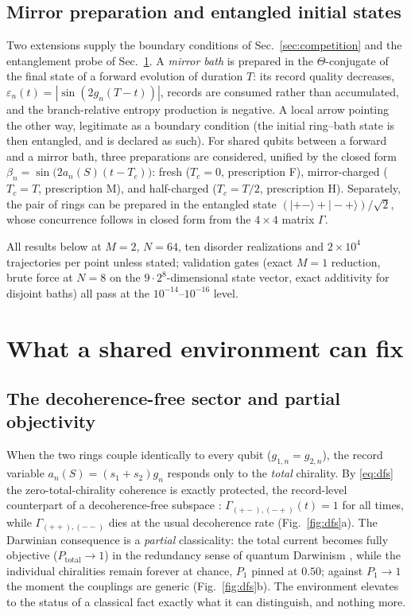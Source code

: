 \documentclass[11pt]{article}
\begin{document}
\subsection{Mirror preparation and entangled initial states}

Two extensions supply the boundary conditions of Sec.~\ref{sec:competition} and the entanglement probe of Sec.~\ref{sec:fix}. A \emph{mirror bath} is prepared in the $\Theta$-conjugate of the final state of a forward evolution of duration $T$: its record quality decreases, $\varepsilon_n(t)=|\sin(2g_n(T-t))|$, records are consumed rather than accumulated, and the branch-relative entropy production is negative. A local arrow pointing the other way, legitimate as a boundary condition (the initial ring--bath state is then entangled, and is declared as such). For shared qubits between a forward and a mirror bath, three preparations are considered, unified by the closed form $\beta_n=\sin\!\big(2a_n(S)(t-T_c)\big)$: fresh ($T_c{=}0$, prescription F), mirror-charged ($T_c{=}T$, prescription M), and half-charged ($T_c{=}T/2$, prescription H). Separately, the pair of rings can be prepared in the entangled state $(|{+}{-}\rangle+|{-}{+}\rangle)/\sqrt2$, whose concurrence follows in closed form from the $4\times4$ matrix $\Gamma$.

All results below at $M{=}2$, $N{=}64$, ten disorder realizations and $2\times10^4$ trajectories per point unless stated; validation gates (exact $M{=}1$ reduction, brute force at $N{=}8$ on the $9\cdot2^8$-dimensional state vector, exact additivity for disjoint baths) all pass at the $10^{-14}$--$10^{-16}$ level.

\section{What a shared environment can fix}\label{sec:fix}

\subsection{The decoherence-free sector and partial objectivity}

When the two rings couple identically to every qubit ($g_{1,n}=g_{2,n}$), the record variable $a_n(S)=(s_1+s_2)g_n$ responds only to the \emph{total} chirality. By \eqref{eq:dfs} the zero-total-chirality coherence is exactly protected, the record-level counterpart of a decoherence-free subspace \cite{LidarDFS,Zanardi}: $\Gamma_{(+-),(-+)}(t)=1$ for all times, while $\Gamma_{(++),(--)}$ dies at the usual decoherence rate (Fig.~\ref{fig:dfs}a). The Darwinian consequence is a \emph{partial} classicality: the total current becomes fully objective ($P_{\mathrm{total}}\to1$) in the redundancy sense of quantum Darwinism \cite{Zurek2009,Riedel2012}, while the individual chiralities remain forever at chance, $P_1$ pinned at $0.50$; against $P_1\to1$ the moment the couplings are generic (Fig.~\ref{fig:dfs}b). The environment elevates to the status of a classical fact exactly what it can distinguish, and nothing more.
\end{document}
